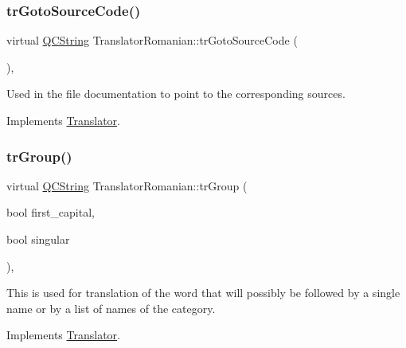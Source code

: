 \mbox{\label{class_translator_romanian_ae11f19540494e32f6ded4da0c166e391}} 
\subsubsection{\texorpdfstring{trGotoSourceCode()}{trGotoSourceCode()}}
{\footnotesize\ttfamily virtual \mbox{\hyperlink{class_q_c_string}{Q\+C\+String}} Translator\+Romanian\+::tr\+Goto\+Source\+Code (\begin{DoxyParamCaption}{ }\end{DoxyParamCaption})\hspace{0.3cm}{\ttfamily [inline]}, {\ttfamily [virtual]}}

Used in the file documentation to point to the corresponding sources. 

Implements \mbox{\hyperlink{class_translator}{Translator}}.

\mbox{\label{class_translator_romanian_a1fc9b8c974122a961fad25e160508d88}} 
\subsubsection{\texorpdfstring{trGroup()}{trGroup()}}
{\footnotesize\ttfamily virtual \mbox{\hyperlink{class_q_c_string}{Q\+C\+String}} Translator\+Romanian\+::tr\+Group (\begin{DoxyParamCaption}\item[{bool}]{first\+\_\+capital,  }\item[{bool}]{singular }\end{DoxyParamCaption})\hspace{0.3cm}{\ttfamily [inline]}, {\ttfamily [virtual]}}

This is used for translation of the word that will possibly be followed by a single name or by a list of names of the category. 

Implements \mbox{\hyperlink{class_translator}{Translator}}.

\mbox{\label{class_translator_romanian_a74c79ac4e4f950cd35bc9297d372b0ac}} 
